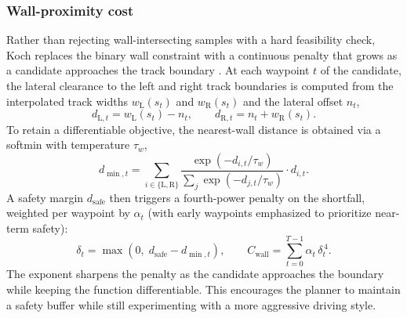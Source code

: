 \subsubsection{Wall-proximity cost}
Rather than rejecting wall-intersecting samples with a hard feasibility check, Koch replaces the binary wall constraint with a continuous penalty that grows as a candidate approaches the track boundary \cite{koch_DifferentiableInterpretablePath_2025}.
At each waypoint $t$ of the candidate, the lateral clearance to the left and right track boundaries is computed from the interpolated track widths $w_{\text{L}}(s_t)$ and $w_{\text{R}}(s_t)$ and the lateral offset $n_t$,
\begin{equation}
    d_{\text{L}, t} = w_{\text{L}}(s_t) - n_t, \qquad d_{\text{R}, t} = n_t + w_{\text{R}}(s_t).
\end{equation}
To retain a differentiable objective, the nearest-wall distance is obtained via a softmin with temperature $\tau_w$,
\begin{equation}
    d_{\min, t} = \sum_{i \in \{\text{L}, \text{R}\}} \frac{\exp(-d_{i,t} / \tau_w)}{\sum_{j} \exp(-d_{j,t} / \tau_w)} \cdot d_{i, t}.
\end{equation}
A safety margin $d_{\text{safe}}$ then triggers a fourth-power penalty on the shortfall, weighted per waypoint by $\alpha_t$ (with early waypoints emphasized to prioritize near-term safety):
\begin{equation}
    \delta_t = \max(0,\; d_{\text{safe}} - d_{\min, t}), \qquad C_{\text{wall}} = \sum_{t=0}^{T-1} \alpha_t \, \delta_t^{\,4}.
\end{equation}
The exponent sharpens the penalty as the candidate approaches the boundary while keeping the function differentiable. This encourages the planner to maintain a safety buffer while still experimenting with a more aggressive driving style.

